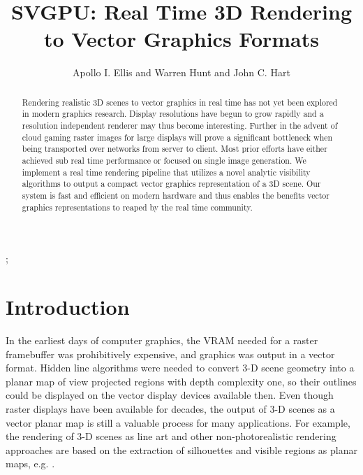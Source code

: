 \documentclass[review]{acmsiggraph}
\title{SVGPU: Real Time 3D Rendering to Vector Graphics Formats}
\author{Apollo I. Ellis and Warren Hunt and John C. Hart}
\begin{document}

 \teaser{
 }

\maketitle

\begin{abstract}

Rendering realistic 3D scenes to vector graphics in real time has not yet been explored in modern graphics research. Display resolutions have begun to grow rapidly and a resolution independent renderer may thus become interesting. Further in the advent of cloud gaming raster images for large displays will prove a significant bottleneck when being transported over networks from server to client.  Most prior efforts have either achieved sub real time performance or focused on single image generation. We implement a real time rendering pipeline that utilizes a novel analytic visibility algorithms to output a compact vector graphics representation of a 3D scene. Our system is fast and efficient on modern hardware and thus enables the benefits vector graphics representations to reaped by the real time community.

\end{abstract}

\begin{CRcatlist}
  ;
\end{CRcatlist}

\keywordlist


\copyrightspace

\section{Introduction}
In the earliest days of computer graphics, the VRAM needed for a raster
framebuffer was prohibitively expensive, and graphics was output in a vector
format. Hidden line algorithms were needed to convert 3-D scene geometry into
a planar map of view projected regions with depth complexity one, so their
outlines could be displayed on the vector display devices available then. Even
though raster displays have been available for decades, the output of 3-D
scenes as a vector planar map is still a valuable process for many
applications. For example, the rendering of 3-D scenes as line art and other
non-photorealistic rendering approaches are based on the extraction of
silhouettes and visible regions as planar maps, e.g. \cite{lineart,npr}.
\end{document}
